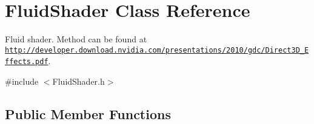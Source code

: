 \hypertarget{class_fluid_shader}{\section{Fluid\-Shader Class Reference}
\label{class_fluid_shader}
}


Fluid shader. Method can be found at \href{http://developer.download.nvidia.com/presentations/2010/gdc/Direct3D_Effects.pdf}{\tt http\-://developer.\-download.\-nvidia.\-com/presentations/2010/gdc/\-Direct3\-D\-\_\-\-Effects.\-pdf}.  




{\ttfamily \#include $<$Fluid\-Shader.\-h$>$}

\subsection*{Public Member Functions}
